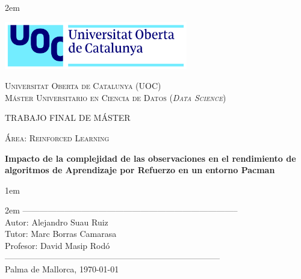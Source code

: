 \newpage
\thispagestyle{empty}

\baselineskip 2em


\centerline{\includegraphics[width=0.6\textwidth]{images/UOC-logo}}
\begin{center}
\textsc{Universitat Oberta de Catalunya (UOC) \\
 Máster Universitario en Ciencia de Datos (\textit{Data Science})\\}


\vspace*{1.5cm}

\textsc{\Large TRABAJO FINAL DE MÁSTER}

\vspace*{0.5cm}

\textsc{\large Área: Reinforced Learning}



\vspace*{2.0cm}

\textbf{\Large Impacto de la complejidad de las observaciones en el rendimiento de algoritmos de Aprendizaje por Refuerzo en un entorno Pacman}

\vspace{2.5cm}
\baselineskip 1em

\baselineskip 2em
-----------------------------------------------------------------------------\\
Autor:      Alejandro Suau Ruiz\\
Tutor:      Marc Borras Camarasa\\
Profesor:   David Masip Rodó\\
-----------------------------------------------------------------------------\\
\vspace*{1.5cm}
Palma de Mallorca, \today

\end{center}

\newpage
\pagestyle{empty}
\hfill

